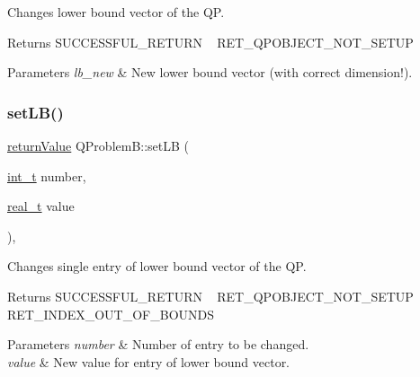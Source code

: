 Changes lower bound vector of the QP. \begin{DoxyReturn}{Returns}
S\+U\+C\+C\+E\+S\+S\+F\+U\+L\+\_\+\+R\+E\+T\+U\+RN ~\newline
 R\+E\+T\+\_\+\+Q\+P\+O\+B\+J\+E\+C\+T\+\_\+\+N\+O\+T\+\_\+\+S\+E\+T\+UP 
\end{DoxyReturn}

\begin{DoxyParams}{Parameters}
{\em lb\+\_\+new} & New lower bound vector (with correct dimension!). \\
\hline
\end{DoxyParams}
\mbox{\label{class_q_problem_b_a1e3a58f51f4ac880f2584580074b1608}} 
\subsubsection{\texorpdfstring{set\+L\+B()}{setLB()}\hspace{0.1cm}{\footnotesize\ttfamily [2/2]}}
{\footnotesize\ttfamily \hyperlink{_message_handling_8hpp_a81d556f613bfbabd0b1f9488c0fa865e}{return\+Value} Q\+Problem\+B\+::set\+LB (\begin{DoxyParamCaption}\item[{\hyperlink{_types_8hpp_ab6fd6105e64ed14a0c9281326f05e623}{int\+\_\+t}}]{number,  }\item[{\hyperlink{qp_o_a_s_e_s__wrapper_8h_a0d00e2b3dfadee81331bbb39068570c4}{real\+\_\+t}}]{value }\end{DoxyParamCaption})\hspace{0.3cm}{\ttfamily [inline]}, {\ttfamily [protected]}}

Changes single entry of lower bound vector of the QP. \begin{DoxyReturn}{Returns}
S\+U\+C\+C\+E\+S\+S\+F\+U\+L\+\_\+\+R\+E\+T\+U\+RN ~\newline
 R\+E\+T\+\_\+\+Q\+P\+O\+B\+J\+E\+C\+T\+\_\+\+N\+O\+T\+\_\+\+S\+E\+T\+UP ~\newline
 R\+E\+T\+\_\+\+I\+N\+D\+E\+X\+\_\+\+O\+U\+T\+\_\+\+O\+F\+\_\+\+B\+O\+U\+N\+DS 
\end{DoxyReturn}

\begin{DoxyParams}{Parameters}
{\em number} & Number of entry to be changed. \\
\hline
{\em value} & New value for entry of lower bound vector. \\
\hline
\end{DoxyParams}
\mbox{\label{class_q_problem_b_a5401e252d34757797ce3e913644e8b2c}} 
